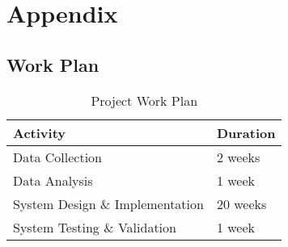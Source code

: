 \documentclass{article}
\begin{document}
\section{Appendix}
\subsection{Work Plan}
\vspace*{8mm}

\begin{table}[h!]
\centering
\begin{tabular} {  | m{8cm} | m{6cm}| }
 \hline
 \textbf{Activity} &  \textbf{Duration}\\
 \hline
Data Collection & 2 weeks \\
\hline
 Data Analysis& 1 week \\
\hline
System Design \& Implementation & 20 weeks \\
\hline
System Testing \& Validation & 1 week  \\
\hline
\end{tabular}
\caption{Project Work Plan}
\label{table:4}
\end{table}
\vspace*{8mm}


\end{document}
